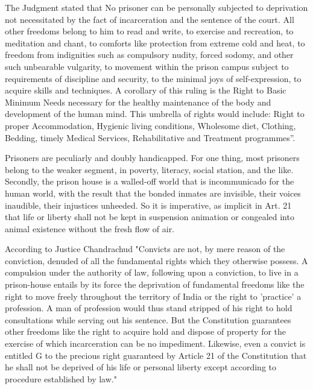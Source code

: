 \begin{multicols}{2}
\noi
The Judgment stated that No prisoner can be personally subjected to deprivation not necessitated by the fact of incarceration and the sentence of the court. All other freedoms belong to him to read and write, to exercise and recreation, to meditation and chant, to comforts like protection from extreme cold and heat, to freedom from indignities such as compulsory nudity, forced sodomy, and other such unbearable vulgarity, to movement within the prison campus subject to requirements of discipline and security, to the minimal joys of self-expression, to acquire skills and techniques. A corollary of this ruling is the Right to Basic Minimum Needs necessary for the healthy maintenance of the body and development of the human mind. This umbrella of rights would include: Right to proper Accommodation, Hygienic living conditions, Wholesome diet, Clothing, Bedding, timely Medical Services, Rehabilitative and Treatment programmes”.

\noi
Prisoners are peculiarly and doubly handicapped. For one thing, most prisoners belong to the weaker segment, in poverty, literacy, social station, and the like. Secondly, the prison house is a walled-off world that is incommunicado for the human world, with the result that the bonded inmates are invisible, their voices inaudible, their injustices unheeded. So it is imperative, as implicit in Art. 21 that life or liberty shall not be kept in suspension animation or congealed into animal existence without the fresh flow of air.

\noi
According to Justice Chandrachud "Convicts are not, by mere reason of the conviction, denuded of all the fundamental rights which they otherwise possess. A compulsion under the authority of law, following upon a conviction, to live in a prison-house entails by its force the deprivation of fundamental freedoms like the right to move freely throughout the territory of India or the right to 'practice' a profession. A man of profession would thus stand stripped of his right to hold consultations while serving out his sentence. But the Constitution guarantees other freedoms like the right to acquire hold and dispose of property for the exercise of which incarceration can be no impediment. Likewise, even a convict is entitled G to the precious right guaranteed by Article 21 of the Constitution that he shall not be deprived of his life or personal liberty except according to procedure established by law."


\end{multicols}
